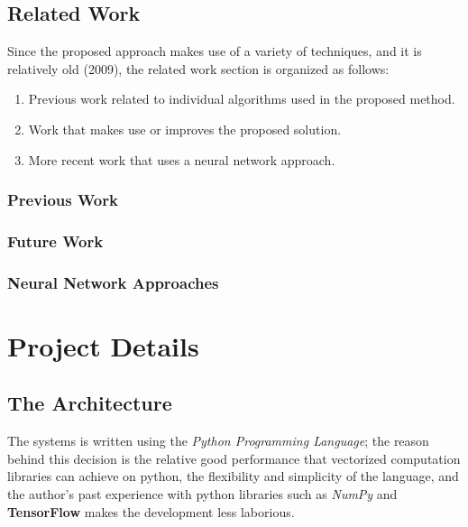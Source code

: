 \documentclass[notitlepage,english]{hgbreport}
\begin{document}
 

\section{Related Work}
Since the proposed approach makes use of a variety of techniques, and it is relatively old (2009), the related work section is organized as follows:
\begin{enumerate}
	\item Previous work related to individual algorithms used in the proposed method.
	\item Work that makes use or improves the proposed solution. 
	\item More recent work that uses a neural network approach.
\end{enumerate}
\subsection{Previous Work}
\subsection{Future Work}
\subsection{Neural Network Approaches}




\chapter{Project Details}


\section{The Architecture}
The systems is written using the \emph{Python Programming Language}; the reason behind this decision is the relative good performance that vectorized computation libraries can achieve on python, the flexibility and simplicity of the language, and the author's past experience with python libraries such as \emph{NumPy} and \textbf{TensorFlow} makes the development less laborious.
\end{document}
